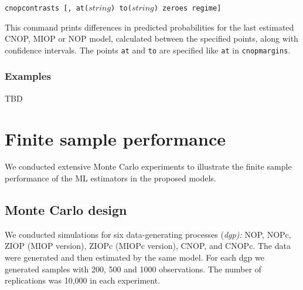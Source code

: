 \documentclass[letterpaper,fleqn,11pt]{article}
\begin{document}
\begin{onehalfspace}
\texttt{cnopcontrasts [, at($string$) to($string$) zeroes regime] }

This command prints differences in predicted probabilities for the last
estimated CNOP, MIOP or NOP model, calculated between the specified points,
along with confidence intervals. The points \texttt{at} and \texttt{to} are
specified like \texttt{at} in \texttt{cnopmargins}.

\subsubsection*{Examples}

TBD

\section{Finite sample performance}

We conducted extensive Monte Carlo experiments to illustrate the finite
sample performance of the ML estimators in the proposed models.

\subsection*{Monte Carlo design}

We conducted simulations for six data-generating processes (\textit{dgp):}
NOP, NOPc, ZIOP (MIOP version), ZIOPc (MIOPc version), CNOP, and CNOPc. The
data were generated and then estimated by the same model. For each dgp we
generated samples with 200, 500 and 1000 observations. The number of
replications was 10,000 in each experiment.


\end{onehalfspace}
\end{document}

